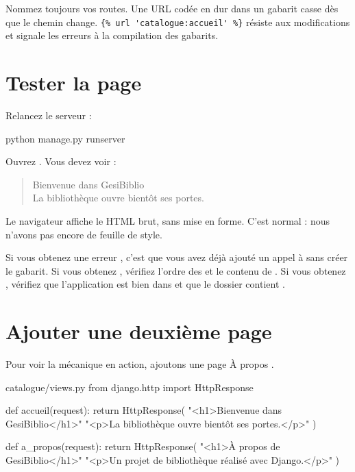 \begin{bonne}
Nommez toujours vos routes. Une URL codée en dur dans un gabarit casse dès que le
chemin change. \lstinline|{% url 'catalogue:accueil' %}| résiste aux modifications
et signale les erreurs à la compilation des gabarits.
\end{bonne}

\section{Tester la page}

Relancez le serveur :

\begin{terminal}
python manage.py runserver
\end{terminal}

Ouvrez . Vous devez voir :

\begin{quote}
\og Bienvenue dans GesiBiblio \fg\\
\og La bibliothèque ouvre bientôt ses portes. \fg
\end{quote}

Le navigateur affiche le HTML brut, sans mise en forme. C'est normal : nous
n'avons pas encore de feuille de style.

\begin{attention}
Si vous obtenez une erreur , c'est que vous avez déjà
ajouté un appel à  sans créer le gabarit. Si vous obtenez
, vérifiez l'ordre des  et le contenu de
. Si vous obtenez , vérifiez que
l'application est bien dans  et que le dossier contient
.
\end{attention}

\section{Ajouter une deuxième page}

Pour voir la mécanique en action, ajoutons une page \og À propos \fg.

\begin{codebox}[python]{catalogue/views.py}
from django.http import HttpResponse


def accueil(request):
    return HttpResponse(
        "<h1>Bienvenue dans GesiBiblio</h1>"
        "<p>La bibliothèque ouvre bientôt ses portes.</p>"
    )


def a_propos(request):
    return HttpResponse(
        "<h1>À propos de GesiBiblio</h1>"
        "<p>Un projet de bibliothèque réalisé avec Django.</p>"
    )
\end{codebox}

